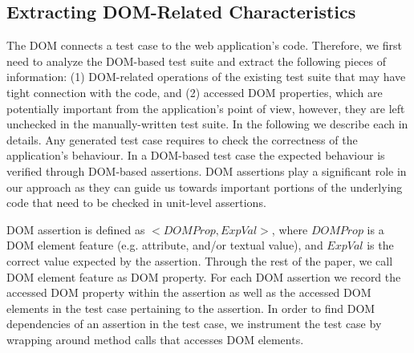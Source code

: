 \subsection{Extracting DOM-Related Characteristics} \label{Sec:extractDomRelatedInfo}
The DOM connects a test case to the web application's \javascript code. Therefore, we first need to analyze the DOM-based test suite and extract the following pieces of information: (1) DOM-related operations of the existing test suite that may have tight connection with the \javascript code, and (2) accessed DOM properties, which are potentially important from the application's point of view, however, they are left unchecked in the manually-written test suite. In the following we describe each in details.
Any generated test case requires to check the correctness of the application's behaviour. In a DOM-based test case the expected behaviour is verified through DOM-based assertions. 
DOM assertions play a significant role in our approach as they can guide us towards important portions of the underlying \javascript code that need to be checked in unit-level assertions.

DOM assertion is defined as $<DOMProp,ExpVal>$, where $DOMProp$ is a DOM element feature (e.g. attribute, and/or textual value), and $ExpVal$ is the correct value expected by the assertion. Through the rest of the paper, we call DOM element feature as DOM property.
For each DOM assertion we record the accessed DOM property within the assertion as well as the accessed DOM elements in the test case pertaining to the assertion. 
In order to find DOM dependencies of an assertion in the test case, we instrument the test case by wrapping around method calls that accesses DOM elements.
 
